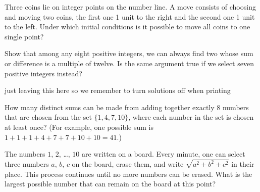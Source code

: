 \begin{problem}
    Three coins lie on integer points on the number line. A move consists of choosing and moving two coins, the first one 1 unit to the right and the second one 1 unit to the left. Under which initial conditions is it possible to move all coins to one single point?
\end{problem}

\begin{problem}
    Show that among any eight positive integers, we can always find two whose sum or difference is a multiple of twelve. Is the same argument true if we select seven positive integers instead?
\end{problem}

\begin{solution}
    just leaving this here so we remember to turn solutions off when printing
\end{solution}

\begin{problem}
    How many distinct sums can be made from adding together exactly 8 numbers that are chosen from the set $\{1,4,7,10\}$, where each number in the set is chosen at least once? (For example, one possible sum is $1 + 1 + 1 + 4 + 7 + 7 + 10 + 10 = 41$.)
\end{problem}

\begin{problem}
     The numbers $1$, $2$, \dots, $10$ are written on a board.
  Every minute, one can select three numbers
  $a$, $b$, $c$ on the board, erase them,
  and write $\sqrt{a^2+b^2+c^2}$ in their place.
  This process continues until no more numbers can be erased.
  What is the largest possible number
  that can remain on the board at this point?
\end{problem}


    
